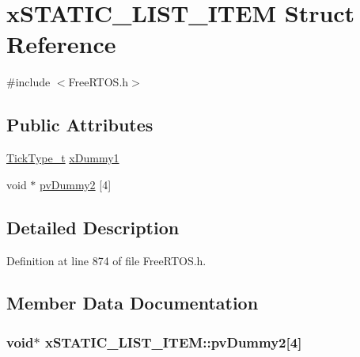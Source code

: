 \hypertarget{structx_s_t_a_t_i_c___l_i_s_t___i_t_e_m}{}\section{x\+S\+T\+A\+T\+I\+C\+\_\+\+L\+I\+S\+T\+\_\+\+I\+T\+EM Struct Reference}
\label{structx_s_t_a_t_i_c___l_i_s_t___i_t_e_m}


{\ttfamily \#include $<$Free\+R\+T\+O\+S.\+h$>$}

\subsection*{Public Attributes}
\begin{DoxyCompactItemize}
\item 
\hyperlink{portmacro_8h_aa69c48c6e902ce54f70886e6573c92a9}{Tick\+Type\+\_\+t} \hyperlink{structx_s_t_a_t_i_c___l_i_s_t___i_t_e_m_abdb8e415f1bcfbba19fbf57d8d4e9438}{x\+Dummy1}
\item 
void $\ast$ \hyperlink{structx_s_t_a_t_i_c___l_i_s_t___i_t_e_m_a53c6cb2b8094f991254635d04c9be55b}{pv\+Dummy2} \mbox{[}4\mbox{]}
\end{DoxyCompactItemize}


\subsection{Detailed Description}


Definition at line 874 of file Free\+R\+T\+O\+S.\+h.



\subsection{Member Data Documentation}
\subsubsection[{\texorpdfstring{pv\+Dummy2}{pvDummy2}}]{\setlength{\rightskip}{0pt plus 5cm}void$\ast$ x\+S\+T\+A\+T\+I\+C\+\_\+\+L\+I\+S\+T\+\_\+\+I\+T\+E\+M\+::pv\+Dummy2\mbox{[}4\mbox{]}}\hypertarget{structx_s_t_a_t_i_c___l_i_s_t___i_t_e_m_a53c6cb2b8094f991254635d04c9be55b}{}\label{structx_s_t_a_t_i_c___l_i_s_t___i_t_e_m_a53c6cb2b8094f991254635d04c9be55b}


